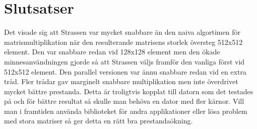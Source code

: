 \section{Slutsatser}
Det visade sig att Strassen var mycket snabbare än den naiva algortimen för matrismultiplikation när den resulterande matrisens storlek översteg 512x512 element. Den var snabbare redan vid 128x128 element men den ökade minnesanvändningen gjorde så att Strassen väljs framför den vanliga först vid 512x512 element. Den parallel versionen var ännu snabbare redan vid en extra tråd. Fler trådar gav marginelt snabbare multiplikation men inte överdrivet mycket bättre prestanda. Detta är troligtvis kopplat till datorn som det testades på och för bättre resultat så skulle man behöva en dator med fler kärnor. Vill man i framtiden använda biblioteket för andra applikationer eller lösa problem med stora matriser så ger detta en rätt bra prestandaökning. 